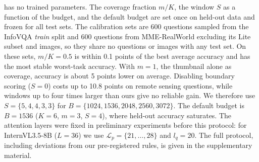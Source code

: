 \method has no trained parameters. The coverage fraction $m/K$, the window $S$ as a function of the
budget, and the default budget are set once on held-out data and frozen for all test sets. The
calibration sets are 600 questions sampled from the InfoVQA \emph{train}
split and 600 questions from MME-RealWorld excluding its Lite subset and images, so they share no
questions or images with any test set. On these sets, $m/K=0.5$ is within 0.1 points of the best
average accuracy and has the most stable worst-task accuracy. With $m=1$, \ie the thumbnail alone as coverage, accuracy is
about 5 points lower on average. Disabling boundary scoring ($S=0$) costs up to 10.8 points on remote
sensing questions, while windows up to four times larger than ours give no reliable gain. We therefore
use $S=\{5,4,4,3,3\}$ for $B=\{1024,1536,2048,2560,3072\}$. The default budget is $B=1536$ ($K=6$,
$m=3$, $S=4$), where held-out accuracy saturates. The attention layers were fixed in preliminary
experiments before this protocol: for InternVL3.5-8B ($L=36$) we use $\mathcal{L}_p=\{21,\dots,28\}$
and $l_q=20$. The full protocol, including deviations from our pre-registered rules, is given in the
supplementary material.


